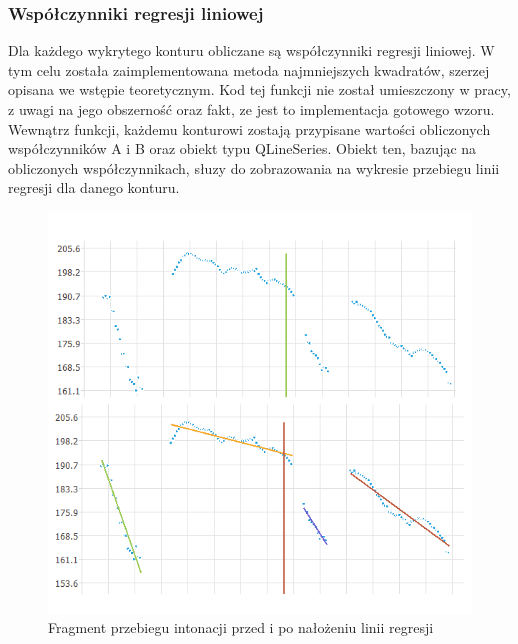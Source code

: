 \documentclass[a4paper,12 pt]{article}
\begin{document}
\subsubsection{Współczynniki regresji liniowej}
Dla każdego wykrytego konturu obliczane są współczynniki regresji liniowej. W tym celu została zaimplementowana metoda najmniejszych kwadratów, szerzej opisana we wstępie teoretycznym.
Kod tej funkcji nie został umieszczony w pracy, z uwagi na jego obszerność oraz fakt, ze jest to  implementacja gotowego wzoru. Wewnątrz funkcji, każdemu konturowi zostają przypisane wartości obliczonych współczynników A i B oraz obiekt typu QLineSeries. Obiekt ten, bazując na obliczonych współczynnikach, słuzy do zobrazowania na wykresie przebiegu linii regresji dla danego konturu.
 \FloatBarrier
\begin{figure}[h]
\centering
\includegraphics[scale=0.7]{regresja.png}
\caption{Fragment przebiegu intonacji przed i po nałożeniu linii regresji}
\end{figure}
\FloatBarrier
\end{document}
